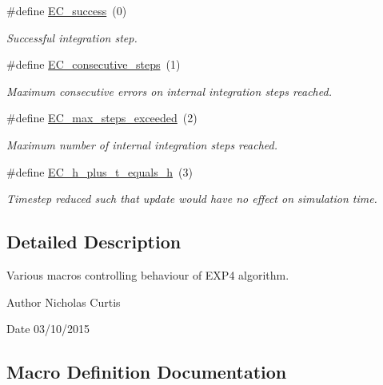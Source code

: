 \begin{DoxyCompactItemize}
\#define \hyperlink{group__exp4cu__ErrCodes_gabd83bc0f9f475a2189a4db4a08b790ca}{E\+C\+\_\+success}~(0)
\begin{DoxyCompactList}\small\item\em Successful integration step. \end{DoxyCompactList}\item 
\#define \hyperlink{group__exp4cu__ErrCodes_gae0287841c08f86f5709660fd731615ad}{E\+C\+\_\+consecutive\+\_\+steps}~(1)
\begin{DoxyCompactList}\small\item\em Maximum consecutive errors on internal integration steps reached. \end{DoxyCompactList}\item 
\#define \hyperlink{group__exp4cu__ErrCodes_ga0f0275d9851ab5c19b79a963d5084df3}{E\+C\+\_\+max\+\_\+steps\+\_\+exceeded}~(2)
\begin{DoxyCompactList}\small\item\em Maximum number of internal integration steps reached. \end{DoxyCompactList}\item 
\#define \hyperlink{group__exp4cu__ErrCodes_ga9326efd544880e2683c4453365ca2704}{E\+C\+\_\+h\+\_\+plus\+\_\+t\+\_\+equals\+\_\+h}~(3)
\begin{DoxyCompactList}\small\item\em Timestep reduced such that update would have no effect on simulation time. \end{DoxyCompactList}\end{DoxyCompactItemize}


\subsection{Detailed Description}
Various macros controlling behaviour of E\+X\+P4 algorithm. 

\begin{DoxyAuthor}{Author}
Nicholas Curtis 
\end{DoxyAuthor}
\begin{DoxyDate}{Date}
03/10/2015 
\end{DoxyDate}


\subsection{Macro Definition Documentation}
